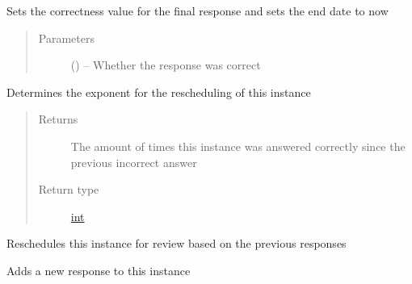 \documentclass[letterpaper,10pt,english]{sphinxmanual}
\begin{document}
\begin{fulllineitems}
\begin{fulllineitems}
\label{\detokenize{instance:instance.Instance.finalise_response}}
Sets the correctness value for the final response and sets the end date to now
\begin{quote}\begin{description}
\item[{Parameters}] \leavevmode
{} (\href{https://docs.python.org/2/library/functions.html\#bool}{}) -- Whether the response was correct

\end{description}\end{quote}

\end{fulllineitems}


\begin{fulllineitems}
\label{\detokenize{instance:instance.Instance.get_exponent}}
Determines the exponent for the rescheduling of this instance
\begin{quote}\begin{description}
\item[{Returns}] \leavevmode
The amount of times this instance was answered correctly since the previous incorrect answer

\item[{Return type}] \leavevmode
\href{https://docs.python.org/2/library/functions.html\#int}{int}

\end{description}\end{quote}

\end{fulllineitems}


\begin{fulllineitems}
\label{\detokenize{instance:instance.Instance.schedule}}
Reschedules this instance for review based on the previous responses

\end{fulllineitems}


\begin{fulllineitems}
\label{\detokenize{instance:instance.Instance.start_response}}
Adds a new response to this instance

\end{fulllineitems}


\end{fulllineitems}
\end{document}
